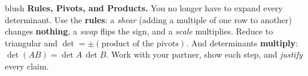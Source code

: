 \documentclass[10pt]{article}
\begin{document}
\namepartnerperiod

\vspace{0.10in}

\begin{headlinebox}{blush}
\small\textbf{Rules, Pivots, and Products.} You no longer have to expand every determinant. Use the
\textbf{rules}: a \emph{shear} (adding a multiple of one row to another) changes \textbf{nothing}, a
\emph{swap} flips the sign, and a \emph{scale} multiplies. Reduce to triangular and $\det=\pm(\text{product
of the pivots})$. And determinants \textbf{multiply}: $\det(AB)=\det A\,\det B$. Work with your partner,
show each step, and \emph{justify} every claim.
\end{headlinebox}

\vspace{0.10in}
\end{document}
